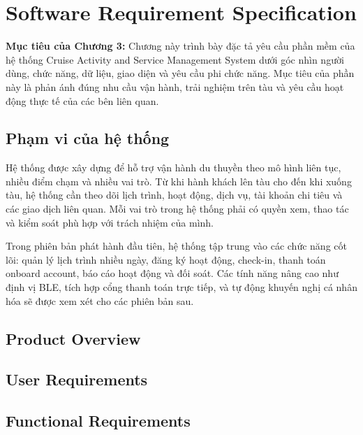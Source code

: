 \setcounter{chapter}{2}
\chapter{Software Requirement Specification}
\label{ch:3}

\noindent\textbf{Mục tiêu của Chương 3:} Chương này trình bày đặc tả yêu cầu phần mềm của hệ thống Cruise Activity and Service Management System dưới góc nhìn người dùng, chức năng, dữ liệu, giao diện và yêu cầu phi chức năng. Mục tiêu của phần này là phản ánh đúng nhu cầu vận hành, trải nghiệm trên tàu và yêu cầu hoạt động thực tế của các bên liên quan.

\section{Phạm vi của hệ thống}

Hệ thống được xây dựng để hỗ trợ vận hành du thuyền theo mô hình liên tục, nhiều điểm chạm và nhiều vai trò. Từ khi hành khách lên tàu cho đến khi xuống tàu, hệ thống cần theo dõi lịch trình, hoạt động, dịch vụ, tài khoản chi tiêu và các giao dịch liên quan. Mỗi vai trò trong hệ thống phải có quyền xem, thao tác và kiểm soát phù hợp với trách nhiệm của mình.

Trong phiên bản phát hành đầu tiên, hệ thống tập trung vào các chức năng cốt lõi: quản lý lịch trình nhiều ngày, đăng ký hoạt động, check-in, thanh toán onboard account, báo cáo hoạt động và đối soát. Các tính năng nâng cao như định vị BLE, tích hợp cổng thanh toán trực tiếp, và tự động khuyến nghị cá nhân hóa sẽ được xem xét cho các phiên bản sau.

\section{Product Overview}



\section{User Requirements}



\section{Functional Requirements}

